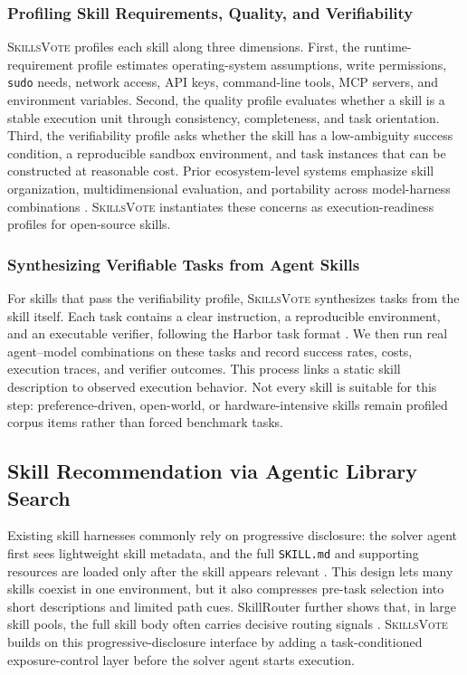 \documentclass{llmxive}
\providecommand{\ours}{\textsc{SkillsVote}\xspace}
\begin{document}
\subsubsection{Profiling Skill Requirements, Quality, and Verifiability}
\ours profiles each skill along three dimensions. First, the runtime-requirement profile estimates operating-system assumptions, write permissions, \texttt{sudo} needs, network access, API keys, command-line tools, MCP servers, and environment variables. Second, the quality profile evaluates whether a skill is a stable execution unit through consistency, completeness, and task orientation. Third, the verifiability profile asks whether the skill has a low-ambiguity success condition, a reproducible sandbox environment, and task instances that can be constructed at reasonable cost. Prior ecosystem-level systems emphasize skill organization, multidimensional evaluation, and portability across model-harness combinations \citep{skvm2026,liang2026skillnet,li2026organizing}. \ours instantiates these concerns as execution-readiness profiles for open-source skills.

\subsubsection{Synthesizing Verifiable Tasks from Agent Skills}
For skills that pass the verifiability profile, \ours synthesizes tasks from the skill itself. Each task contains a clear instruction, a reproducible environment, and an executable verifier, following the Harbor task format \citep{harborFramework}. We then run real agent--model combinations on these tasks and record success rates, costs, execution traces, and verifier outcomes. This process links a static skill description to observed execution behavior. Not every skill is suitable for this step: preference-driven, open-world, or hardware-intensive skills remain profiled corpus items rather than forced benchmark tasks.

\subsection{Skill Recommendation via Agentic Library Search}

Existing skill harnesses commonly rely on progressive disclosure: the solver agent first sees lightweight skill metadata, and the full \texttt{SKILL.md} and supporting resources are loaded only after the skill appears relevant \citep{openai2026codexSkills,anthropic2026claudeCodeSkills,agentSkills}. This design lets many skills coexist in one environment, but it also compresses pre-task selection into short descriptions and limited path cues. SkillRouter further shows that, in large skill pools, the full skill body often carries decisive routing signals \citep{zheng2026skillrouter}. \ours builds on this progressive-disclosure interface by adding a task-conditioned exposure-control layer before the solver agent starts execution.
\end{document}
